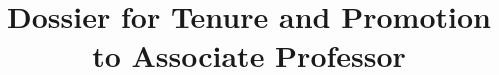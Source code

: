 \documentclass{article}
\begin{document}
\newcommand*\cpiType{\leftmark}

\newcommand*\Date{\today}
\newcommand*\Author{FIRSTNAME LASTNAME}
\newcommand*\Authorshort{F. LASTNAME,}
\newcommand*\position{POSITION}
\newcommand*\room{Room \#}
\newcommand*\department{Department NAME}
\newcommand*\college{College NAME}
\newcommand*\university{University NAME}
\newcommand*\citystatezip{CITY, STATE, ZIP Code}
\newcommand*\phone{123 456-7890}
\newcommand*\emialaddress{X @ Y.edu}
\newcommand*\Webaddress{http://www.X.edu/$\sim$Y}
\newcommand*\newrank{Associate Professor}
\newcommand*\Title{\footnotesize Dossier for Tenure and Promotion to \newrank | \Authorshort}
\title{Dossier for Tenure and Promotion to \newrank} 



\renewcommand{\footrulewidth}{.2pt} 
\renewcommand{\headrulewidth}{0.2pt}
\renewcommand{\contentsname}{Table of Contents}
\newcommand{\sectiontitle}[1]
{
\setlength{\fboxsep}{38pt}
\colorbox{csuOrange}{\makebox[8.25in][l]{ \shortstack[l]{\fontsize{26}{30}\rmfamily\color{white} #1   \hfill}}}
}

\newcommand{\sectiontitledouble}[2]
{
\setlength{\fboxsep}{38pt}
\colorbox{csuOrange}{\makebox[10.25in][l]{\shortstack[l]{\fontsize{26}{30}\rmfamily\color{white}  \minibox[]{#1\\ \hskip1.7cm  #2}  \hfill}}}
}

\newcommand{\fakesection}[1]{%
  \par\refstepcounter{section}%
  \sectionmark{#1}%
  \addcontentsline{toc}{section}{\protect\numberline{\thesection}#1}%
}

\newcommand{\fakesubsection}[1]{%
  \par\refstepcounter{subsection}%
  \subsectionmark{#1}%
  \addcontentsline{toc}{subsection}{\protect\numberline{\thesubsection}#1}%
}

\end{document}
